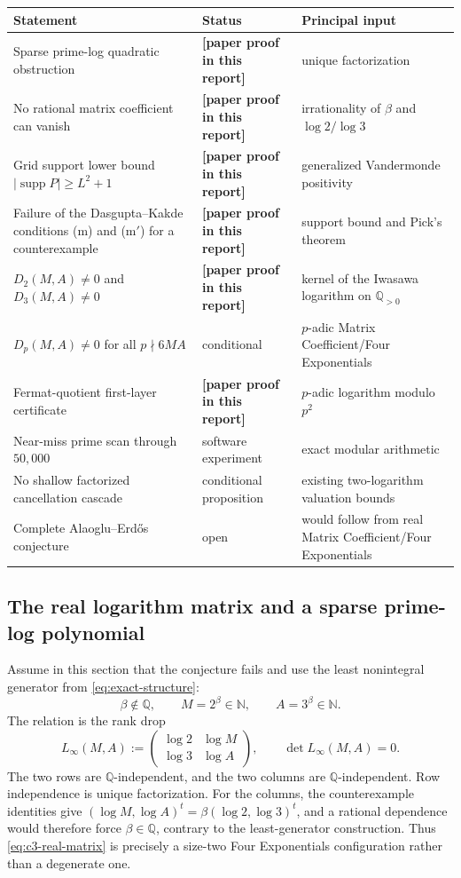 \documentclass[11pt,oneside]{article}
\theoremstyle{definition}
\theoremstyle{remark}
\newcommand{\N}{\mathbb N}
\newcommand{\Q}{\mathbb Q}
\newcommand{\statusnew}{\textcolor{newgreen}{\textbf{[paper proof in this report]}}}
\newcommand{\supp}{\operatorname{supp}}
\begin{document}
\begin{center}
\begin{tabularx}{\textwidth}{@{}>{\raggedright\arraybackslash}p{}
>{\raggedright\arraybackslash}p{}X@{}}
\toprule
Statement & Status & Principal input \\
\midrule
Sparse prime-log quadratic obstruction & \statusnew & unique factorization \\
No rational matrix coefficient can vanish & \statusnew & irrationality of $\beta$ and $\log2/\log3$ \\
Grid support lower bound $|\supp P|\ge L^2+1$ & \statusnew & generalized Vandermonde positivity \\
Failure of the Dasgupta--Kakde conditions (m) and (m$'$) for a counterexample & \statusnew & support bound and Pick's theorem \\
$D_2(M,A)\ne0$ and $D_3(M,A)\ne0$ & \statusnew & kernel of the Iwasawa logarithm on $\Q_{>0}$ \\
$D_p(M,A)\ne0$ for all $p\nmid6MA$ & conditional & $p$-adic Matrix Coefficient/Four Exponentials \\
Fermat-quotient first-layer certificate & \statusnew & $p$-adic logarithm modulo $p^2$ \\
Near-miss prime scan through $50{,}000$ & software experiment & exact modular arithmetic \\
No shallow factorized cancellation cascade & conditional proposition & existing two-logarithm valuation bounds \\
Complete Alaoglu--Erd\H{o}s conjecture & open & would follow from real Matrix Coefficient/Four Exponentials \\
\bottomrule
\end{tabularx}
\end{center}

\subsection{The real logarithm matrix and a sparse prime-log polynomial}
\label{sec:c3-real-matrix}

Assume in this section that the conjecture fails and use the least nonintegral generator from
\eqref{eq:exact-structure}:
\[
  \beta\notin\Q,\qquad M=2^\beta\in\N,\qquad A=3^\beta\in\N.
\]
The relation is the rank drop
\begin{equation}\label{eq:c3-real-matrix}
 L_\infty(M,A):=
 \begin{pmatrix}
   \log2&\log M\\
   \log3&\log A
 \end{pmatrix},
 \qquad
 \det L_\infty(M,A)=0.
\end{equation}
The two rows are $\Q$-independent, and the two columns are $\Q$-independent.  Row
independence is unique factorization.  For the columns, the counterexample identities give
$(\log M,\log A)^t=\beta(\log2,\log3)^t$, and a rational dependence would therefore
force $\beta\in\Q$, contrary to the least-generator construction.  Thus
\eqref{eq:c3-real-matrix} is precisely a size-two Four Exponentials configuration rather than
a degenerate one.
\end{document}
